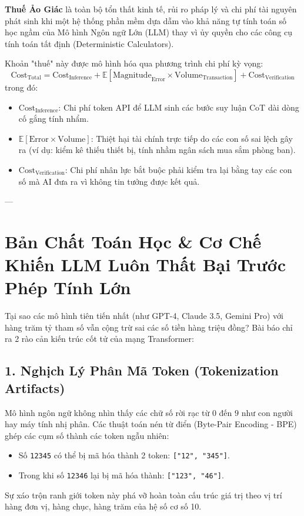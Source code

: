 \documentclass[11pt,a4paper]{article}
\begin{document}
\begin{coreconceptbox}
\textbf{Thuế Ảo Giác} là toàn bộ tổn thất kinh tế, rủi ro pháp lý và chi phí tài nguyên phát sinh khi một hệ thống phần mềm dựa dẫm vào khả năng tự tính toán số học ngầm của Mô hình Ngôn ngữ Lớn (LLM) thay vì ủy quyền cho các công cụ tính toán tất định (Deterministic Calculators). 

Khoản "thuế" này được mô hình hóa qua phương trình chi phí kỳ vọng:
\begin{equation}
    \text{Cost}_{\text{Total}} = \text{Cost}_{\text{Inference}} + \mathbb{E}\left[\text{Magnitude}_{\text{Error}} \times \text{Volume}_{\text{Transaction}}\right] + \text{Cost}_{\text{Verification}}
\end{equation}
trong đó:
\begin{itemize}[leftmargin=1.5em]
    \item $\text{Cost}_{\text{Inference}}$: Chi phí token API để LLM sinh các bước suy luận CoT dài dòng cố gắng tính nhẩm.
    \item $\mathbb{E}[\text{Error} \times \text{Volume}]$: Thiệt hại tài chính trực tiếp do các con số sai lệch gây ra (ví dụ: kiểm kê thiếu thiết bị, tính nhầm ngân sách mua sắm phòng ban).
    \item $\text{Cost}_{\text{Verification}}$: Chi phí nhân lực bắt buộc phải kiểm tra lại bằng tay các con số mà AI đưa ra vì không tin tưởng được kết quả.
\end{itemize}
\end{coreconceptbox}

---

\section{Bản Chất Toán Học \& Cơ Chế Khiến LLM Luôn Thất Bại Trước Phép Tính Lớn}

Tại sao các mô hình tiên tiến nhất (như GPT-4, Claude 3.5, Gemini Pro) với hàng trăm tỷ tham số vẫn cộng trừ sai các số tiền hàng triệu đồng? Bài báo chỉ ra 2 rào cản kiến trúc cốt tử của mạng Transformer:

\subsection{1. Nghịch Lý Phân Mã Token (Tokenization Artifacts)}
Mô hình ngôn ngữ không nhìn thấy các chữ số rời rạc từ $0$ đến $9$ như con người hay máy tính nhị phân. Các thuật toán nén từ điển (Byte-Pair Encoding - BPE) ghép các cụm số thành các token ngẫu nhiên:
\begin{itemize}[leftmargin=1.5em]
    \item Số \texttt{12345} có thể bị mã hóa thành 2 token: \texttt{["12", "345"]}.
    \item Trong khi số \texttt{12346} lại bị mã hóa thành: \texttt{["123", "46"]}.
\end{itemize}
Sự xáo trộn ranh giới token này phá vỡ hoàn toàn cấu trúc giá trị theo vị trí hàng đơn vị, hàng chục, hàng trăm của hệ số cơ số 10.
\end{document}
